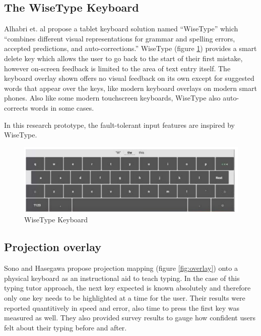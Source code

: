 \documentclass[english]{vgtc}
\begin{document}
\subsection{The WiseType Keyboard}
Alhabri et. al propose a tablet keyboard solution named \textquotedblleft WiseType\textquotedblright{}
\cite{alhabri19} which \textquotedblleft combines different visual
representations for grammar and spelling errors, accepted predictions,
and auto-corrections.\textquotedblright{} WiseType (figure \ref{fig:wisetype_keyboard}) provides
a smart delete key which allows the user to go back to the start of
their first mistake, however on-screen feedback is limited to the
area of text entry itself. The keyboard overlay shown offers no visual
feedback on its own except for suggested words that appear over the
keys, like modern keyboard overlays on modern smart phones. Also like
some modern touchscreen keyboards, WiseType also auto-corrects words
in some cases.

In this research prototype, the fault-tolerant input features are inspired by WiseType.

\begin{figure}[!htb]
  \centering
  \includegraphics[width=0.95\columnwidth]{WiseType}
  \caption{WiseType Keyboard \cite{alhabri19}}
  \label{fig:wisetype_keyboard}
\end{figure}

\subsection{Projection overlay}
Sono and Hasegawa \cite{Sono19} propose projection mapping (figure
\ref{fig:overlay}) onto a physical keyboard as an instructional aid to teach typing.
In the case of this typing tutor approach, the next key expected is
known absolutely and therefore only one key needs to be highlighted
at a time for the user. Their results were reported quantitively in
speed and error, also time to press the first key was measured as
well. They also provided survey results to gauge how confident users
felt about their typing before and after. 
\end{document}
